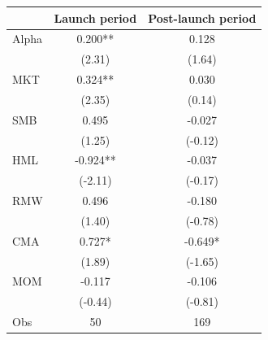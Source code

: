 \begin{tabular}{lcc}
\toprule
 & Launch period & Post-launch period \\
\midrule
Alpha & 0.200** & 0.128 \\
 & (2.31) & (1.64) \\
MKT & 0.324** & 0.030 \\
 & (2.35) & (0.14) \\
SMB & 0.495 & -0.027 \\
 & (1.25) & (-0.12) \\
HML & -0.924** & -0.037 \\
 & (-2.11) & (-0.17) \\
RMW & 0.496 & -0.180 \\
 & (1.40) & (-0.78) \\
CMA & 0.727* & -0.649* \\
 & (1.89) & (-1.65) \\
MOM & -0.117 & -0.106 \\
 & (-0.44) & (-0.81) \\
\midrule
Obs & 50 & 169 \\
\bottomrule
\end{tabular}
